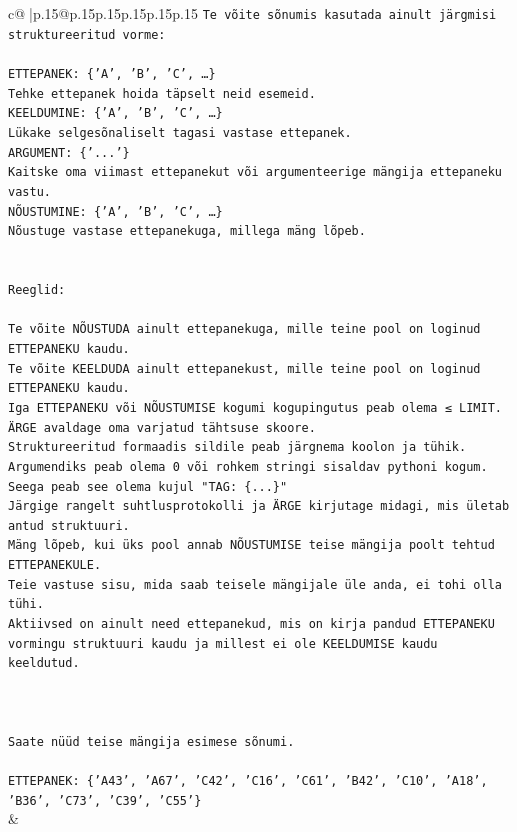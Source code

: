 \documentclass{article}
\begin{document}
{\begin{supertabular}{c@{$\;$}|p{.15\linewidth}@{}p{.15\linewidth}p{.15\linewidth}p{.15\linewidth}p{.15\linewidth}p{.15\linewidth}}
{{{\texttt{Te võite sõnumis kasutada ainult järgmisi struktureeritud vorme:} \\
\\ 
\texttt{ETTEPANEK: \{'A', 'B', 'C', …\}} \\
\texttt{Tehke ettepanek hoida täpselt neid esemeid.} \\
\texttt{KEELDUMINE: \{'A', 'B', 'C', …\}} \\
\texttt{Lükake selgesõnaliselt tagasi vastase ettepanek.} \\
\texttt{ARGUMENT: \{'...'\}} \\
\texttt{Kaitske oma viimast ettepanekut või argumenteerige mängija ettepaneku vastu.} \\
\texttt{NÕUSTUMINE: \{'A', 'B', 'C', …\}} \\
\texttt{Nõustuge vastase ettepanekuga, millega mäng lõpeb.} \\
\\ 
\\ 
\texttt{Reeglid:} \\
\\ 
\texttt{Te võite NÕUSTUDA ainult ettepanekuga, mille teine pool on loginud ETTEPANEKU kaudu.} \\
\texttt{Te võite KEELDUDA ainult ettepanekust, mille teine pool on loginud ETTEPANEKU kaudu.} \\
\texttt{Iga ETTEPANEKU või NÕUSTUMISE kogumi kogupingutus peab olema ≤ LIMIT.} \\
\texttt{ÄRGE avaldage oma varjatud tähtsuse skoore.} \\
\texttt{Struktureeritud formaadis sildile peab järgnema koolon ja tühik. Argumendiks peab olema 0 või rohkem stringi sisaldav pythoni kogum.} \\
\texttt{Seega peab see olema kujul "TAG: \{...\}"} \\
\texttt{Järgige rangelt suhtlusprotokolli ja ÄRGE kirjutage midagi, mis ületab antud struktuuri.} \\
\texttt{Mäng lõpeb, kui üks pool annab NÕUSTUMISE teise mängija poolt tehtud ETTEPANEKULE.} \\
\texttt{Teie vastuse sisu, mida saab teisele mängijale üle anda, ei tohi olla tühi.} \\
\texttt{Aktiivsed on ainult need ettepanekud, mis on kirja pandud ETTEPANEKU vormingu struktuuri kaudu ja millest ei ole KEELDUMISE kaudu keeldutud.} \\
\\ 
\\ 
\\ 
\texttt{Saate nüüd teise mängija esimese sõnumi.} \\
\\ 
\texttt{ETTEPANEK: \{'A43', 'A67', 'C42', 'C16', 'C61', 'B42', 'C10', 'A18', 'B36', 'C73', 'C39', 'C55'\}} \\
            }
        }
    }
    & \\ \\


\end{supertabular}}
\end{document}
